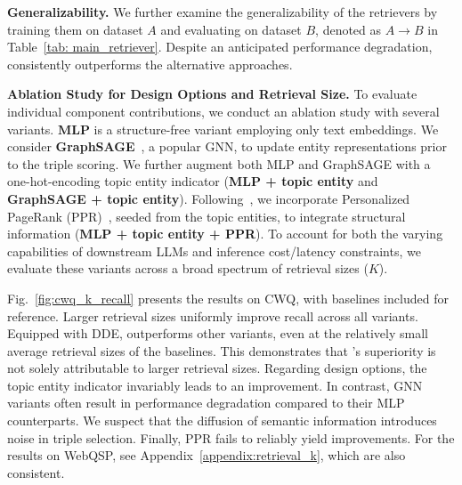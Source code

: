 \textbf{Generalizability.} We further examine the generalizability of the retrievers by training them on dataset $A$ and evaluating on dataset $B$, denoted as $A\rightarrow B$ in Table~\ref{tab: main_retriever}. Despite an anticipated performance degradation, \proj consistently outperforms the alternative approaches.

\textbf{Ablation Study for Design Options and Retrieval Size.} To evaluate individual component contributions, we conduct an ablation study with several variants. $\textbf{MLP}$ is a structure-free variant employing only text embeddings. We consider \textbf{GraphSAGE}~\citep{NIPS2017_5dd9db5e}, a popular GNN, to update entity representations prior to the triple scoring. We further augment both MLP and GraphSAGE with a one-hot-encoding topic entity indicator (\textbf{MLP + topic entity} and \textbf{GraphSAGE + topic entity}). Following~\citet{sun-etal-2018-open}, we incorporate Personalized PageRank (PPR)~\citep{10.1145/511446.511513}, seeded from the topic entities, to integrate structural information (\textbf{MLP + topic entity + PPR}). To account for both the varying capabilities of downstream LLMs and inference cost/latency constraints, we evaluate these variants across a broad spectrum of retrieval sizes ($K$).

Fig.~\ref{fig:cwq_k_recall} presents the results on CWQ, with baselines included for reference. Larger retrieval sizes uniformly improve recall across all variants. Equipped with DDE, \proj outperforms other variants, even at the relatively small average retrieval sizes of the baselines. This demonstrates that \proj's superiority is not solely attributable to larger retrieval sizes. Regarding design options, the topic entity indicator invariably leads to an improvement. In contrast, GNN variants often result in performance degradation compared to their MLP counterparts. We suspect that the diffusion of semantic information introduces noise in triple selection. Finally, PPR fails to reliably yield improvements. For the results on WebQSP, see Appendix~\ref{appendix:retrieval_k}, which are also consistent.

